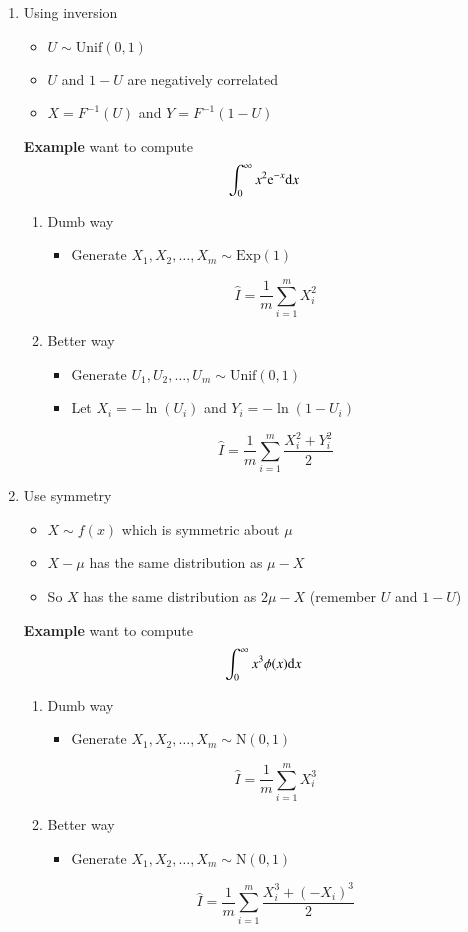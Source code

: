 \documentclass[captions=tableheading]{scrbook}
\begin{document}
\begin{enumerate}
\item Using inversion
\begin{itemize}
\item $U \sim \mathrm{Unif}(0,1)$
\item $U$ and $1-U$ are negatively correlated
\item $X = F^{-1}(U)$ and $Y = F^{-1}(1 - U)$
\end{itemize}
\textbf{Example}  want to compute
   \[
   \int_{0}^{\infty}x^{2}\mathrm{e}^{-x} \mathrm{d} x
   \]
\begin{enumerate}
\item Dumb way
\begin{itemize}
\item Generate  \(X_{1},X_{2},\ldots,X_{m}\sim \mathrm{Exp}(1)\)
\end{itemize}
\[
      \hat{I}=\frac{1}{m} \sum_{i = 1}^{m}X_{i}^{2}
      \]
\item Better way
\begin{itemize}
\item Generate  \(U_{1},U_{2},\ldots,U_{m}\sim \mathrm{Unif}(0,1)\)
\item Let $X_{i} = -\ln(U_{i})$ and $Y_{i} = -\ln(1 - U_{i})$
\end{itemize}
\[
      \hat{I}=\frac{1}{m} \sum_{i = 1}^{m}\frac{X_{i}^{2} + Y_{i}^{2}}{2}
      \]
\end{enumerate}
\item Use symmetry
\begin{itemize}
\item $X \sim f(x)$ which is symmetric about $\mu$
\item $X - \mu$ has the same distribution as $\mu - X$
\item So $X$ has the same distribution as $2\mu - X$ (remember $U$ and $1 - U$)
\end{itemize}
\textbf{Example}  want to compute
   \[
   \int_{0}^{\infty}x^{3}\phi(x) \mathrm{d} x
   \]
\begin{enumerate}
\item Dumb way
\begin{itemize}
\item Generate  \(X_{1},X_{2},\ldots,X_{m}\sim \mathrm{N}(0,1)\)
\end{itemize}
\[
      \hat{I}=\frac{1}{m} \sum_{i = 1}^{m}X_{i}^{3}
      \]
\item Better way
\begin{itemize}
\item Generate  \(X_{1},X_{2},\ldots,X_{m}\sim \mathrm{N}(0,1)\)
\end{itemize}
\[
      \hat{I}=\frac{1}{m} \sum_{i = 1}^{m}\frac{X_{i}^{3} + (-X_{i})^{3}}{2}
      \]
\end{enumerate}
\end{enumerate}
\end{document}
